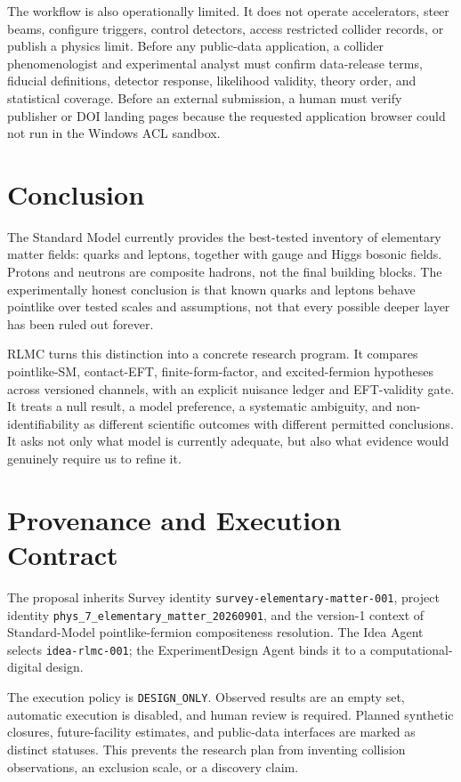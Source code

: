 The workflow is also operationally limited. It does not operate accelerators, steer beams, configure triggers, control detectors, access restricted collider records, or publish a physics limit. Before any public-data application, a collider phenomenologist and experimental analyst must confirm data-release terms, fiducial definitions, detector response, likelihood validity, theory order, and statistical coverage. Before an external submission, a human must verify publisher or DOI landing pages because the requested application browser could not run in the Windows ACL sandbox.

\section{Conclusion}

The Standard Model currently provides the best-tested inventory of elementary matter fields: quarks and leptons, together with gauge and Higgs bosonic fields. Protons and neutrons are composite hadrons, not the final building blocks. The experimentally honest conclusion is that known quarks and leptons behave pointlike over tested scales and assumptions, not that every possible deeper layer has been ruled out forever.

RLMC turns this distinction into a concrete research program. It compares pointlike-SM, contact-EFT, finite-form-factor, and excited-fermion hypotheses across versioned channels, with an explicit nuisance ledger and EFT-validity gate. It treats a null result, a model preference, a systematic ambiguity, and non-identifiability as different scientific outcomes with different permitted conclusions. It asks not only what model is currently adequate, but also what evidence would genuinely require us to refine it.


\appendices
\section{Provenance and Execution Contract}

The proposal inherits Survey identity \texttt{survey-elementary-matter-001}, project identity \texttt{phys\_7\_elementary\_matter\_20260901}, and the version-1 context of Standard-Model pointlike-fermion compositeness resolution. The Idea Agent selects \texttt{idea-rlmc-001}; the ExperimentDesign Agent binds it to a computational-digital design.

The execution policy is \texttt{DESIGN\_ONLY}. Observed results are an empty set, automatic execution is disabled, and human review is required. Planned synthetic closures, future-facility estimates, and public-data interfaces are marked as distinct statuses. This prevents the research plan from inventing collision observations, an exclusion scale, or a discovery claim.

